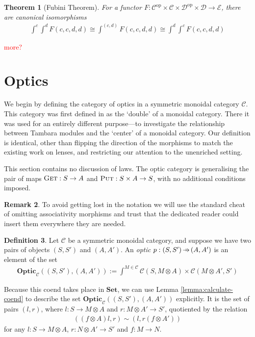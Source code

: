 \documentclass[11pt,a4paper]{article}
\theoremstyle{plain}
\newtheorem{theorem}{Theorem}[subsection]
\theoremstyle{definition}
\newtheorem{definition}[theorem]{Definition}
\newtheorem{remark}[theorem]{Remark}
\newcommand{\C}{\mathscr{C}}
\newcommand{\D}{\mathscr{D}}
\newcommand{\E}{\mathscr{E}}
\newcommand{\Set}{\mathbf{Set}}
\newcommand{\Optic}{\mathbf{Optic}}
\newcommand{\op}{\mathrm{op}}
\newcommand{\fget}{\textsc{Get}}
\newcommand{\fput}{\textsc{Put}}
\newcommand{\hto}{\ensuremath{\,\mathaccent\shortmid\rightarrow\,}}
\newcommand{\todo}[1]{\textcolor{red}{\small #1}}
\begin{document}
\begin{theorem}[Fubini Theorem]
For a functor $F : \C^\op \times \C \times \D^\op \times \D \to \E$, there are canonical isomorphisms
\begin{align*}
\int^c \int^d F(c, c, d, d) \cong \int^{(c, d)} F(c, c, d, d) \cong \int^d \int^c F(c, c, d, d)
\end{align*}
\end{theorem}

\todo{more?}

\section{Optics}
\label{sec-optics}

We begin by defining the category of optics in a symmetric monoidal category $\C$. This category was first defined in \cite[Section 6]{Doubles} as the `double' of a monoidal category. There it was used for an entirely different purpose---to investigate the relationship between Tambara modules and the `center' of a monoidal category. Our definition is identical, other than flipping the direction of the morphisms to match the existing work on lenses, and restricting our attention to the unenriched setting.

This section contains no discussion of laws. The optic category is  generalising the pair of maps $\fget : S \to A$ and $\fput : S \times A \to S$, with no additional conditions imposed.

\begin{remark}
  To avoid getting lost in the notation we will use the standard cheat of omitting associativity morphisms and trust that the dedicated reader could insert them everywhere they are needed.
\end{remark}

\begin{definition}
  Let $\C$ be a symmetric monoidal category, and suppose we have two pairs of objects $(S, S')$ and $(A, A')$. An \emph{optic} $p : (S, S') \hto (A, A')$ is an element of the set
  \begin{align*}
    \Optic_\C((S, S'), (A, A')) := \int^{M \in \C} \C(S, M \otimes A) \times \C(M \otimes A', S')
  \end{align*}
\end{definition}

Because this coend takes place in $\Set$, we can use Lemma \ref{lemma:calculate-coend} to describe the set $\Optic_\C((S, S'), (A, A'))$ explicitly. It is the set of pairs $(l, r)$, where $l : S \to M \otimes A$ and $r : M \otimes A' \to S'$, quotiented by the relation
\begin{align*}
  ((f \otimes A) l, r) \sim (l, r (f \otimes A'))
\end{align*}
for any $l : S \to M \otimes A$, $r : N \otimes A' \to S'$ and $f : M \to N$.
\end{document}

